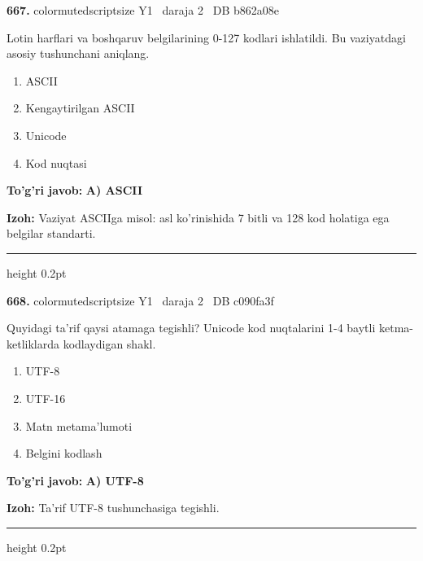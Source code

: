 \documentclass[10pt,a4paper,oneside]{article}
\begin{document}
\noindent\textbf{\color{ink}667.}  {color{muted}scriptsize Y1 \textbullet\ daraja 2 \textbullet\ DB b862a08e}
\par
Lotin harflari va boshqaruv belgilarining 0-127 kodlari ishlatildi. Bu vaziyatdagi asosiy tushunchani aniqlang.
\begin{enumerate}[label=\Alph*),leftmargin=9mm]
\item ASCII
\item Kengaytirilgan ASCII
\item Unicode
\item Kod nuqtasi
\end{enumerate}
\begin{tcolorbox}[enhanced,breakable,colback=teal!4,colframe=teal!50!black,boxrule=0.5pt,arc=1.1mm,left=3mm,right=3mm,top=1.7mm,bottom=1.7mm,before skip=2mm,after skip=2mm]
\textbf{\color{teal}To'g'ri javob:} \textbf{A) ASCII}
\par\smallskip
\textbf{Izoh:} Vaziyat ASCIIga misol: asl ko'rinishida 7 bitli va 128 kod holatiga ega belgilar standarti.
\end{tcolorbox}
\vspace{2mm}\hrule height 0.2pt \vspace{3mm}

\noindent\textbf{\color{ink}668.}  {color{muted}scriptsize Y1 \textbullet\ daraja 2 \textbullet\ DB c090fa3f}
\par
Quyidagi ta'rif qaysi atamaga tegishli? Unicode kod nuqtalarini 1-4 baytli ketma-ketliklarda kodlaydigan shakl.
\begin{enumerate}[label=\Alph*),leftmargin=9mm]
\item UTF-8
\item UTF-16
\item Matn metama'lumoti
\item Belgini kodlash
\end{enumerate}
\begin{tcolorbox}[enhanced,breakable,colback=teal!4,colframe=teal!50!black,boxrule=0.5pt,arc=1.1mm,left=3mm,right=3mm,top=1.7mm,bottom=1.7mm,before skip=2mm,after skip=2mm]
\textbf{\color{teal}To'g'ri javob:} \textbf{A) UTF-8}
\par\smallskip
\textbf{Izoh:} Ta'rif UTF-8 tushunchasiga tegishli.
\end{tcolorbox}
\vspace{2mm}\hrule height 0.2pt \vspace{3mm}
\end{document}
